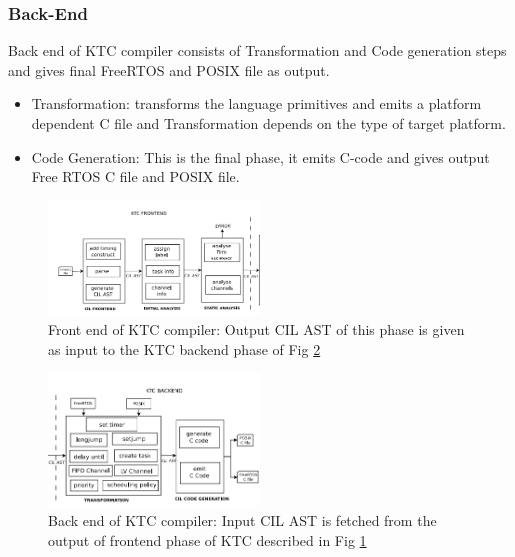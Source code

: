\documentclass[conference]{IEEEtran}
\begin{document}
\subsubsection{Back-End}
Back end of KTC compiler consists of Transformation and Code generation steps and gives final FreeRTOS and POSIX file as output.
\begin{itemize}
	\item Transformation: transforms the language primitives and emits a platform dependent C file and Transformation depends on the type of target platform.
\end{itemize}
\begin{itemize}
	\item Code Generation: This is the final phase, it emits C-code and gives output Free RTOS C file and POSIX file.
\end{itemize}

\begin{figure}[!htbp]
	\centering
	\includegraphics[width=0.5\textwidth]{graphics/KTCFront}
	\caption{Front end of KTC compiler\cite{8430085}: Output CIL AST of this phase is given as input to the KTC backend phase of Fig \ref{fig:KTCBack}} \label{fig:KTCFront}
\end{figure}

\begin{figure}[!htbp]
	\centering
	\includegraphics[width=0.5\textwidth]{graphics/KTCback}
	\caption{Back end of KTC compiler\cite{8430085}: Input CIL AST is fetched from the output of frontend phase of KTC described in Fig \ref{fig:KTCFront}} \label{fig:KTCBack}
\end{figure}






\end{document}
